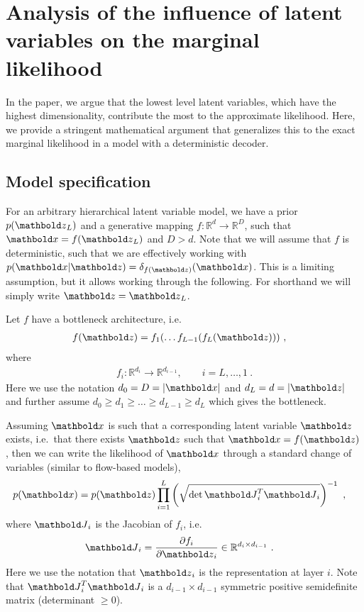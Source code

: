 {\section{Analysis of the influence of latent variables on the marginal likelihood}
In the paper, we argue that the lowest level latent variables, which have the highest dimensionality, contribute the most to the approximate likelihood.
Here, we provide a stringent mathematical argument that generalizes this to the exact marginal likelihood in a model with a deterministic decoder.

\subsection{Model specification}
For an arbitrary hierarchical latent variable model, we have a prior $p(\zb_L)$ and a generative mapping $f: \mathbb{R}^d \rightarrow \mathbb{R}^D$, such that $\xb = f(\zb_L)$ and $D>d$.
Note that we will assume that $f$ is deterministic, such that we are effectively working with $p(\xb|\zb) = \delta_{f(\zb)}(\xb)$.
This is a limiting assumption, but it allows working through the following. For shorthand we will simply write $\zb=\zb_L$.

Let $f$ have a bottleneck architecture, i.e.\
\begin{align}
f(\zb) &= f_1(\ldots f_{L-1}(f_L(\zb))) \ ,
\end{align}
where
\begin{align}
    f_i: \mathbb{R}^{d_{i}} \rightarrow \mathbb{R}^{d_{i-1}}, \qquad i = L, \ldots, 1 \ .
\end{align}
Here we use the notation $d_0=D=\vert\xb\vert$ and $d_L=d=\vert\zb\vert$ and further assume $d_0\geq d_1\geq \ldots \geq d_{L-1} \geq d_L$ which gives the bottleneck.

Assuming $\xb$ is such that a corresponding latent variable $\zb$ exists, i.e.\ that there exists $\zb$ such that $\xb = f(\zb)$, then we can write the likelihood of $\xb$ through a standard change of variables (similar to flow-based models),
\begin{align}
    p(\xb) &= p(\zb) \prod_{i = 1}^L \left(\sqrt{\det \Jb_i^T \Jb_i}\right)^{-1} \ ,
\end{align}
where $\Jb_i$ is the Jacobian of $f_i$, i.e.
\begin{align}
    \Jb_i &= \frac{\partial f_i}{\partial \zb_i} \in \mathbb{R}^{d_i\times d_{i-1}} \ .
\end{align}
Here we use the notation that $\zb_i$ is the representation at layer $i$.
Note that $\Jb_i^T \Jb_i$ is a $d_{i-1} \times d_{i-1}$ symmetric positive semidefinite matrix (determinant $\geq 0$).

}
